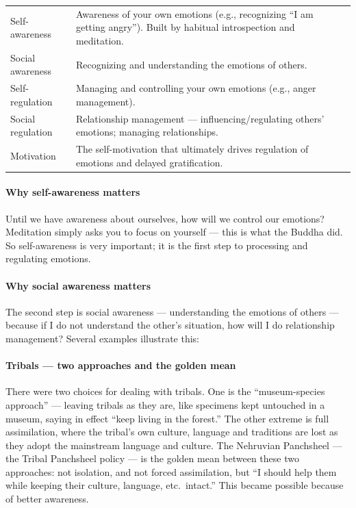 \begin{center}
\begin{tabularx}{\textwidth}{>{\raggedright\arraybackslash}p{3.4cm} Y}
 &  \\
\toprule
Self-awareness & Awareness of your own emotions (e.g., recognizing ``I am getting angry''). Built by habitual introspection and meditation. \\
Social awareness & Recognizing and understanding the emotions of others. \\
Self-regulation & Managing and controlling your own emotions (e.g., anger management). \\
Social regulation & Relationship management --- influencing/regulating others' emotions; managing relationships. \\
Motivation & The self-motivation that ultimately drives regulation of emotions and delayed gratification. \\
\bottomrule
\end{tabularx}
\end{center}

\paragraph{Why self-awareness matters} Until we have awareness about ourselves, how will we control our emotions? Meditation simply asks you to focus on yourself --- this is what the Buddha did. So self-awareness is very important; it is the first step to processing and regulating emotions.

\paragraph{Why social awareness matters} The second step is social awareness --- understanding the emotions of others --- because if I do not understand the other's situation, how will I do relationship management? Several examples illustrate this:

\paragraph{Tribals --- two approaches and the golden mean} There were two choices for dealing with tribals. One is the ``museum-species approach'' --- leaving tribals as they are, like specimens kept untouched in a museum, saying in effect ``keep living in the forest.'' The other extreme is full assimilation, where the tribal's own culture, language and traditions are lost as they adopt the mainstream language and culture. The Nehruvian Panchsheel --- the Tribal Panchsheel policy --- is the golden mean between these two approaches: not isolation, and not forced assimilation, but ``I should help them while keeping their culture, language, etc.\ intact.'' This became possible because of better awareness.

